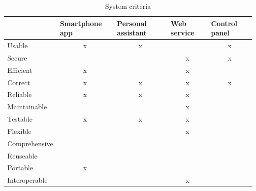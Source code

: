 \begin{table}[H]
\centering
\begin{tabular}{|l|c|c|c|c|}
\hline
              & \multicolumn{1}{l|}{Smartphone app} & \multicolumn{1}{l|}{Personal assistant} & \multicolumn{1}{l|}{Web service} & \multicolumn{1}{l|}{Control panel} \\ \hline
Usable        & x                                   & x                                &                              & x                                  \\ \hline
Secure        &                                     &                                  & x                            & x                                  \\ \hline
Efficient     & x                                   &                                  & x                            &                                    \\ \hline
Correct       & x                                   & x                                & x                            & x                                  \\ \hline
Reliable      & x                                   & x                                & x                            &                                    \\ \hline
Maintainable  &                                     &                                  & x                            &                                    \\ \hline
Testable      & x                                   & x                                & x                            &                                    \\ \hline
Flexible      &                                     &                                  & x                            &                                    \\ \hline
Comprehensive &                                     &                                  &                              &                                    \\ \hline
Reuseable     &                                     &                                  &                              &                                    \\ \hline
Portable      & x                                   &                                  &                              &                                    \\ \hline
Interoperable &                                     &                                  & x                            &                                    \\ \hline
\end{tabular}
\caption{System criteria}
\label{tab:non-functional}
\end{table}

